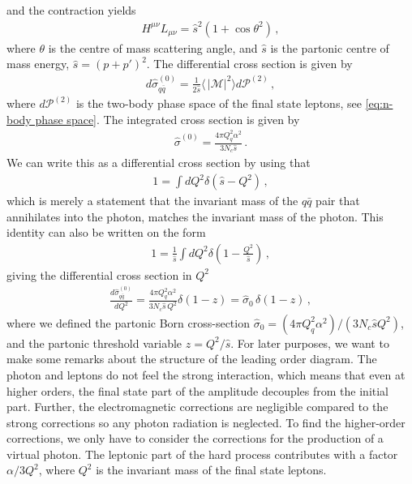 and the contraction yields
\begin{align}
    H^{\mu\nu}L_{\mu\nu}=\hat{s}^{2}(1+\cos\theta^{2})\,,
\end{align}
where $\theta$ is the centre of mass scattering angle, and $\hat{s}$ is the partonic centre of mass energy, $\hat{s}=(p+p')^{2}$. The differential cross section is given by
\begin{align}
    d\hat{\sigma}_{q\bar{q}}^{(0)}=\frac{1}{2\hat{s}}\langle\,|\mathcal{M}|^{2}\rangle d\mathcal{P}^{(2)}\,,
\end{align}
where $d\mathcal{P}^{(2)}$ is the two-body phase space of the final state leptons, see \cref{eq:n-body phase space}. The integrated cross section is given by
\begin{align}
    \hat{\sigma}^{(0)}=\frac{4\pi Q_{q}^{2}\alpha^{2}}{3N_{c}\hat{s}}\,.
\end{align}
We can write this as a differential cross section by using that
\begin{align}
    1=\int dQ^{2}\delta(\hat{s}-Q^{2})\,,
\end{align}
which is merely a statement that the invariant mass of the $q\bar{q}$ pair that annihilates into the photon, matches the invariant mass of the photon. This identity can also be written on the form
\begin{align}
    1=\frac{1}{\hat{s}}\int dQ^{2}\delta(1-\frac{Q^{2}}{\hat{s}})\,,
\end{align}
giving the differential cross section in $Q^{2}$
\begin{align}
    \frac{d\hat{\sigma}_{q\bar{q}}^{(0)}}{dQ^{2}}=\frac{4\pi Q_{q}^{2}\alpha^{2}}{3N_{c}\hat{s}\,Q^{2}}\delta(1-z)=\hat{\sigma}_{0}\,\delta(1-z)\,,
\end{align}
where we defined the partonic Born cross-section $\hat{\sigma}_0=(4\pi Q_{q}^{2}\alpha^{2})/(3N_{c}\hat{s}Q^{2})$, and the partonic threshold variable $z=Q^{2}/\hat{s}$. For later purposes, we want to make some remarks about the structure of the leading order diagram. The photon and leptons do not feel the strong interaction, which means that even at higher orders, the final state part of the amplitude decouples from the initial part. Further, the electromagnetic corrections are negligible compared to the strong corrections so any photon radiation is neglected. To find the higher-order corrections, we only have to consider the corrections for the production of a virtual photon. The leptonic part of the hard process contributes with a factor $\alpha/3Q
^{2}$, where $Q^{2}$ is the invariant mass of the final state leptons.

